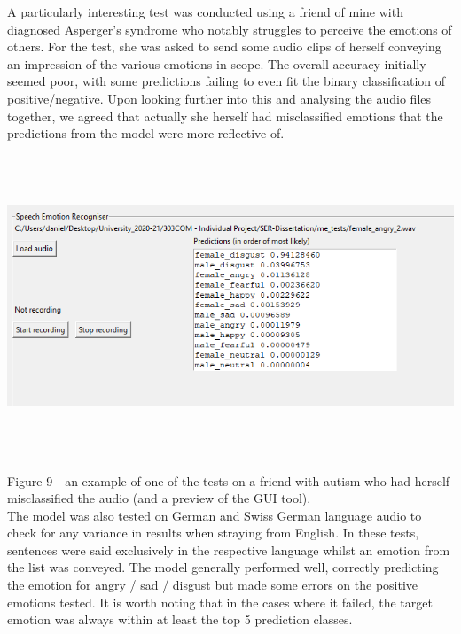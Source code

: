 \documentclass[12pt]{article}
\begin{document}
\noindent A particularly interesting test was conducted using a friend of mine with diagnosed Asperger's syndrome who notably struggles to perceive the emotions of others. For the test, she was asked to send some audio clips of herself conveying an impression of the various emotions in scope. The overall accuracy initially seemed poor, with some predictions failing to even fit the binary classification of positive/negative. Upon looking further into this and analysing the audio files together, we agreed that actually she herself had misclassified emotions that the predictions from the model were more reflective of. 
\begin{center}
\includegraphics[width=16cm, height=9cm]{figure_9_autism}
\end{center}
Figure 9 - an example of one of the tests on a friend with autism who had herself misclassified the audio (and a preview of the GUI tool).
\\

\noindent The model was also tested on German and Swiss German language audio to check for any variance in results when straying from English. In these tests, sentences were said exclusively in the respective language whilst an emotion from the list was conveyed. The model generally performed well, correctly predicting the emotion for angry / sad / disgust but made some errors on the positive emotions tested. It is worth noting that in the cases where it failed, the target emotion was always within at least the top 5 prediction classes.
\end{document}

